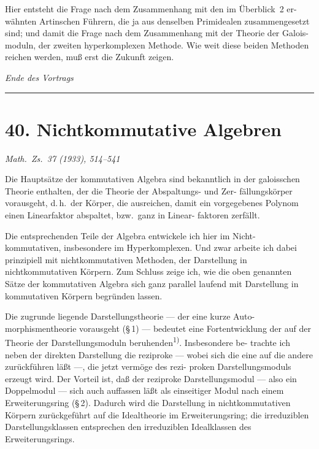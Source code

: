 \documentclass[12pt,a4paper]{article}
\theoremstyle{plain}
\begin{document}
Hier entsteht die Frage nach dem Zusammenhang mit den im \"Uberblick~2 er-
w\"ahnten Artinschen F\"uhrern, die ja aus denselben Primidealen zusammengesetzt
sind; und damit die Frage nach dem Zusammenhang mit der Theorie der Galois-
moduln, der zweiten hyperkomplexen Methode. Wie weit diese beiden Methoden
reichen werden, mu\ss{} erst die Zukunft zeigen.

\begin{flushright}
\textit{Ende des Vortrags}
\end{flushright}

\vspace{1cm}
\noindent\rule{\textwidth}{0.6pt}



\section*{40. Nichtkommutative Algebren}
\label{sec:nichtkommutative}

\begin{center}
\small\textit{Math.\ Zs.\ 37 (1933), 514--541}
\end{center}


\medskip


Die Haupts\"atze der kommutativen Algebra sind bekanntlich in der
galoisschen Theorie enthalten, der die Theorie der Abspaltungs- und Zer-
f\"allungsk\"orper vorausgeht, d.\,h.\ der K\"orper, die ausreichen, damit ein
vorgegebenes Polynom einen Linearfaktor abspaltet, bzw.\ ganz in Linear-
faktoren zerf\"allt.

Die entsprechenden Teile der Algebra entwickele ich hier im Nicht-
kommutativen, insbesondere im Hyperkomplexen. Und zwar arbeite ich
dabei prinzipiell mit nichtkommutativen Methoden, der Darstellung in
nichtkommutativen K\"orpern. Zum Schluss zeige ich, wie die oben genannten
S\"atze der kommutativen Algebra sich ganz parallel laufend mit Darstellung
in kommutativen K\"orpern begr\"unden lassen.

Die zugrunde liegende Darstellungstheorie --- der eine kurze Auto-
morphismentheorie vorausgeht (\S\,1) --- bedeutet eine Fortentwicklung der
auf der Theorie der Darstellungsmoduln beruhenden\textsuperscript{1)}. Insbesondere be-
trachte ich neben der direkten Darstellung die reziproke --- wobei sich
die eine auf die andere zur\"uckf\"uhren l\"a\ss t ---, die jetzt verm\"oge des rezi-
proken Darstellungsmoduls erzeugt wird. Der Vorteil ist, da\ss{} der reziproke
Darstellungsmodul --- also ein Doppelmodul --- sich auch auffassen l\"a\ss t
als einseitiger Modul nach einem Erweiterungsring (\S\,2). Dadurch wird
die Darstellung in nichtkommutativen K\"orpern zur\"uckgef\"uhrt auf die
Idealtheorie im Erweiterungsring; die irreduziblen Darstellungsklassen
entsprechen den irreduziblen Idealklassen des Erweiterungsrings.
\end{document}
